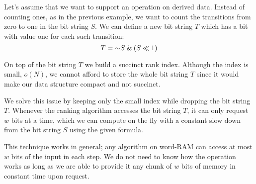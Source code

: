 Let's assume that we want to support an operation on derived data.
Instead of counting ones, as in the previous example, we want to count the transitions from zero to one in the bit string $S$.
We can define a new bit string $T$ which has a bit with value one for each such transition:
$$ T = \mathord{\sim} S \mathbin{\&} (S \mathbin{\ll} 1)$$

On top of the bit string $T$ we build a succinct rank index.
Although the index is small, $o(N)$, we cannot afford to store the whole bit string $T$ since it would make our data structure compact and not succinct.

We solve this issue by keeping only the small index while dropping the bit string $T$.
Whenever the ranking algorithm accesses the bit string $T$, it can only request $w$ bits at a time, which we can compute on the fly with a constant slow down from the bit string $S$ using the given formula.

This technique works in general; any algorithm on word-RAM can access at most $w$ bits of the input in each step.
We do not need to know how the operation works as long as we are able to provide it any chunk of $w$ bits of memory in constant time upon request.
